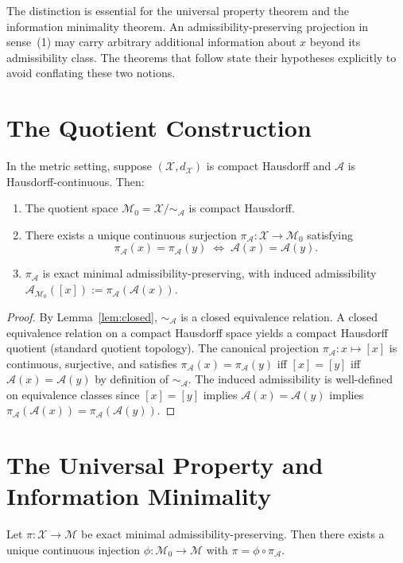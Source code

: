 \documentclass[12pt, a4paper, oneside]{book}
\newcommand{\Adm}{\mathcal{A}}
\newcommand{\X}{\mathcal{X}}
\newcommand{\M}{\mathcal{M}}
\newcommand{\proj}{\pi}
\newcommand{\projA}{\pi_{\!\Adm}}
\newcommand{\SA}{{\sim_{\!\Adm}}}
\begin{document}
\begin{remark}
The distinction is essential for the universal property theorem and the
information minimality theorem. An admissibility-preserving projection in
sense~(1) may carry arbitrary additional information about $x$ beyond its
admissibility class. The theorems that follow state their hypotheses
explicitly to avoid conflating these two notions.
\end{remark}

\section{The Quotient Construction}

\begin{theorem}
\label{thm:quotient}
In the metric setting, suppose $(\X, d_\X)$ is compact Hausdorff and
$\Adm$ is Hausdorff-continuous. Then:
\begin{enumerate}
  \item The quotient space $\M_0 = \X/\SA$ is compact Hausdorff.
  \item There exists a unique continuous surjection
    $\projA : \X \to \M_0$ satisfying
    \[
      \projA(x) = \projA(y) \;\iff\; \Adm(x) = \Adm(y).
    \]
  \item $\projA$ is exact minimal admissibility-preserving, with induced
    admissibility $\Adm_{\M_0}([x]) := \projA(\Adm(x))$.
\end{enumerate}
\end{theorem}

\begin{proof}
By Lemma~\ref{lem:closed}, $\SA$ is a closed equivalence relation.
A closed equivalence relation on a compact Hausdorff space yields a
compact Hausdorff quotient (standard quotient topology). The canonical
projection $\projA : x \mapsto [x]$ is continuous, surjective, and
satisfies $\projA(x) = \projA(y)$ iff $[x] = [y]$ iff $\Adm(x) = \Adm(y)$
by definition of $\SA$. The induced admissibility is well-defined on
equivalence classes since $[x] = [y]$ implies $\Adm(x) = \Adm(y)$
implies $\projA(\Adm(x)) = \projA(\Adm(y))$.
\end{proof}

\section{The Universal Property and Information Minimality}

\begin{theorem}
\label{thm:minimal}
Let $\proj : \X \to \M$ be exact minimal admissibility-preserving.
Then there exists a unique continuous injection $\phi : \M_0 \to \M$
with $\proj = \phi \circ \projA$.
\end{theorem}
\end{document}
